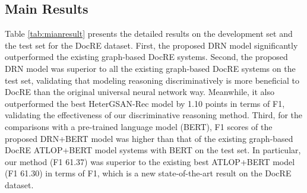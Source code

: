 \documentclass[11pt,a4paper]{article}
\begin{document}
\subsection{Main Results}
\label{sec4-3}
Table \ref{tab:mianresult} presents the detailed results on the development set and the test set for the DocRE dataset. 
First, the proposed DRN model significantly outperformed the existing graph-based DocRE systems. 
Second, the proposed DRN model was superior to all the existing graph-based DocRE systems on the test set, validating that modeling reasoning discriminatively is more beneficial to DocRE than the original universal neural network way.
Meanwhile, it also outperformed the best HeterGSAN-Rec model by 1.10 points in terms of F1, validating the effectiveness of our discriminative reasoning method.
Third, for the comparisons with a pre-trained language model (BERT), F1 scores of the proposed DRN+BERT model was higher than that of the existing graph-based DocRE ATLOP+BERT model systems with BERT on the test set.
In particular, our method (F1 61.37) was superior to the existing best ATLOP+BERT model (F1 61.30) in terms of F1, which is a new state-of-the-art result on the DocRE dataset.
\end{document}
